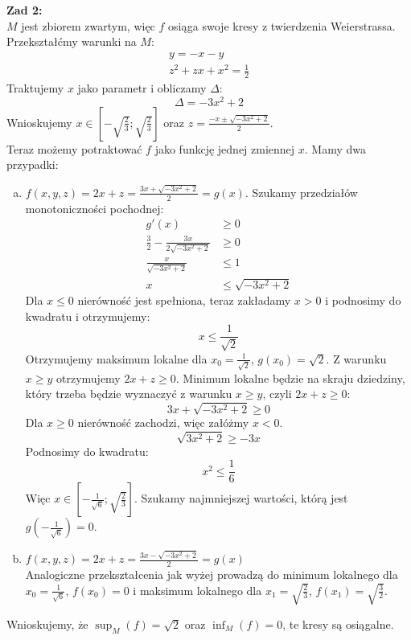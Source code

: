 \documentclass[11pt]{article}
\newcommand{\Dis}{\displaystyle}
\newcommand{\half}{\frac{1}{2}}
\begin{document}
\newpage

\textbf{Zad 2:} \\[5pt]
$M$ jest zbiorem zwartym, więc $f$ osiąga swoje kresy z twierdzenia Weierstrassa. \\ 
Przekształćmy warunki na $M$:
\begin{align*}
    y = -x - y \\
    z^2 + zx + x^2 = \half
\end{align*}
Traktujemy $x$ jako parametr i obliczamy $\Delta$:
$$\Delta = -3x^2+2$$
Wnioskujemy $x \in \left[-\sqrt{\frac{2}{3}}; \sqrt{\frac{2}{3}}\right]$ oraz $\Dis z = \frac{-x \pm \sqrt{-3x^2+2}}{2}$. \\[5pt]
Teraz możemy potraktować $f$ jako funkcję jednej zmiennej $x$. Mamy dwa przypadki:
\begin{enumerate}[(a)]
    \item $\Dis f(x,y,z) = 2x + z = \frac{3x + \sqrt{-3x^2+2}}{2} = g(x)$. Szukamy przedziałów monotoniczności pochodnej:
    \begin{align*}
        g'(x) &\geq 0 \\
        \frac{3}{2} - \frac{3x}{2\sqrt{-3x^2+2}} &\geq 0 \\
        \frac{x}{\sqrt{-3x^2+2}} &\leq 1 \\
        x &\leq \sqrt{-3x^2+2}
    \end{align*}
    Dla $x \leq 0$ nierówność jest spełniona, teraz zakładamy $x > 0$ i podnosimy do kwadratu i otrzymujemy:
    $$x \leq \frac{1}{\sqrt{2}}$$
    Otrzymujemy maksimum lokalne dla $x_0 = \frac{1}{\sqrt{2}}$, $g(x_0) = \sqrt{2}$.
    Z warunku $x \geq y$ otrzymujemy $2x + z \geq 0$. Minimum lokalne będzie na skraju dziedziny, który trzeba będzie wyznaczyć z warunku $x \geq y$, czyli $2x + z \geq 0$:
    $$3x + \sqrt{-3x^2+2} \geq 0$$
    Dla $x \geq 0$ nierówność zachodzi, więc załóżmy $x < 0$.
    $$\sqrt{3x^2+2} \geq -3x$$
    Podnosimy do kwadratu:
    $$x^2 \leq \frac{1}{6}$$
    Więc $x \in \left[-\frac{1}{\sqrt{6}}; \sqrt{\frac{2}{3}}\right]$.
    Szukamy najmniejszej wartości, którą jest $g\left(-\frac{1}{\sqrt{6}}\right) = 0$.

    \item $\Dis f(x,y,z) = 2x + z = \frac{3x - \sqrt{-3x^2+2}}{2} = g(x)$ \\[5pt]
    Analogiczne przekształcenia jak wyżej prowadzą do minimum lokalnego dla $x_0 = \frac{1}{\sqrt{6}}$, $f(x_0) = 0$ i maksimum lokalnego dla $x_1 = \sqrt{\frac{2}{3}}$, $f(x_1) = \sqrt{\frac{3}{2}}$.
\end{enumerate}
Wnioskujemy, że $\sup_M(f) = \sqrt{2}$ oraz $\inf_M(f) = 0$, te kresy są osiągalne.
\end{document}

